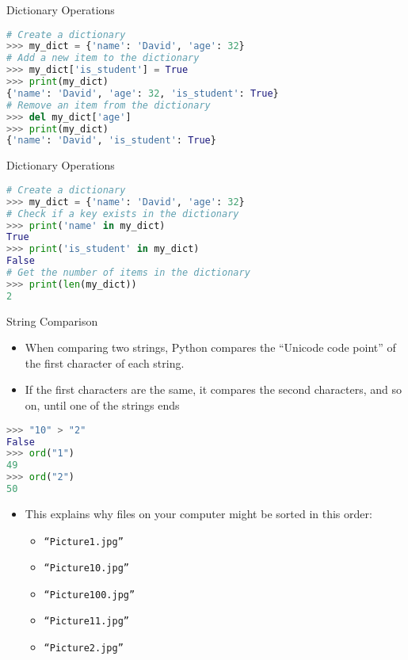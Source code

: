 \begin{frame}[fragile]{Dictionary Operations}
    \begin{lstlisting}[style=colorful, language=Python]
# Create a dictionary
>>> my_dict = {'name': 'David', 'age': 32}
# Add a new item to the dictionary 
>>> my_dict['is_student'] = True
>>> print(my_dict)
{'name': 'David', 'age': 32, 'is_student': True}
# Remove an item from the dictionary
>>> del my_dict['age']
>>> print(my_dict)
{'name': 'David', 'is_student': True}
    \end{lstlisting}
\end{frame} 

\begin{frame}[fragile]{Dictionary Operations}
    \begin{lstlisting}[style=colorful, language=Python]
# Create a dictionary
>>> my_dict = {'name': 'David', 'age': 32}
# Check if a key exists in the dictionary
>>> print('name' in my_dict)
True
>>> print('is_student' in my_dict)
False
# Get the number of items in the dictionary
>>> print(len(my_dict))
2
    \end{lstlisting}
\end{frame} 


\begin{frame}[fragile]{String Comparison}
    \begin{itemize}
        \item When comparing two strings, Python compares the ``Unicode code point'' of the first character of each string.
        \item If the first characters are the same, it compares the second characters, and so on, until one of the strings ends
    \end{itemize}

    \begin{lstlisting}[style=colorful, language=Python]
>>> "10" > "2"
False
>>> ord("1")
49
>>> ord("2")
50
    \end{lstlisting}
\end{frame}

\begin{frame}
    \begin{itemize}
        \item This explains why files on your computer might be sorted in this order:
        \begin{itemize}
            \item \texttt{``Picture1.jpg''}
            \item \texttt{``Picture10.jpg''}
            \item \texttt{``Picture100.jpg''}
            \item \texttt{``Picture11.jpg''}
            \item \texttt{``Picture2.jpg''}
        \end{itemize}
    \end{itemize}
\end{frame}

